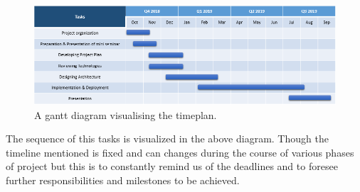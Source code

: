 \begin{figure}[h]
\centering
\includegraphics[scale=.6]{timeplan}
\caption{A gantt diagram visualising the timeplan.}
\end{figure}
The sequence of this tasks is visualized in the above diagram. Though the timeline mentioned is fixed and can changes during the course of various phases of project but this is to constantly remind us of the deadlines and to foresee further responsibilities and milestones to be achieved. 


	